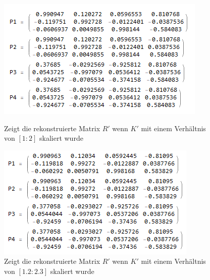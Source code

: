 \begin{figure}[!htb]
	\includegraphics[width=\linewidth]{images/R_12.png}
	\caption{Zeigt die rekonstruierte Matrix $R'$ wenn $K'$ mit einem Verhältnis von $[1:2]$ skaliert wurde}
	\label{fig:awesome_image1}
	\endminipage\hfill
	\includegraphics[width=\linewidth]{images/R_12_23.png}
	\caption{Zeigt die rekonstruierte Matrix $R'$ wenn $K'$ mit einem Verhältnis von $[1.2:2.3]$ skaliert wurde}
	\label{fig:awesome_image2}
	\endminipage\hfill
\end{figure}


